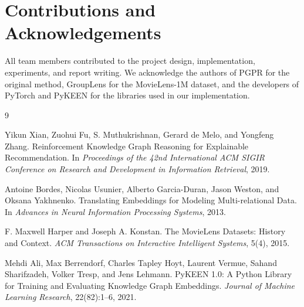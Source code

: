 \documentclass{article}
\begin{document}
\section*{Contributions and Acknowledgements}

All team members contributed to the project design, implementation, experiments, and report writing. We acknowledge the authors of PGPR for the original method, GroupLens for the MovieLens-1M dataset, and the developers of PyTorch and PyKEEN for the libraries used in our implementation.

\begin{thebibliography}{9}

Yikun Xian, Zuohui Fu, S. Muthukrishnan, Gerard de Melo, and Yongfeng Zhang.
\newblock Reinforcement Knowledge Graph Reasoning for Explainable Recommendation.
\newblock In \emph{Proceedings of the 42nd International ACM SIGIR Conference on Research and Development in Information Retrieval}, 2019.

Antoine Bordes, Nicolas Usunier, Alberto Garcia-Duran, Jason Weston, and Oksana Yakhnenko.
\newblock Translating Embeddings for Modeling Multi-relational Data.
\newblock In \emph{Advances in Neural Information Processing Systems}, 2013.

F. Maxwell Harper and Joseph A. Konstan.
\newblock The MovieLens Datasets: History and Context.
\newblock \emph{ACM Transactions on Interactive Intelligent Systems}, 5(4), 2015.

Mehdi Ali, Max Berrendorf, Charles Tapley Hoyt, Laurent Vermue, Sahand Sharifzadeh, Volker Tresp, and Jens Lehmann.
\newblock PyKEEN 1.0: A Python Library for Training and Evaluating Knowledge Graph Embeddings.
\newblock \emph{Journal of Machine Learning Research}, 22(82):1--6, 2021.

\end{thebibliography}
\end{document}
